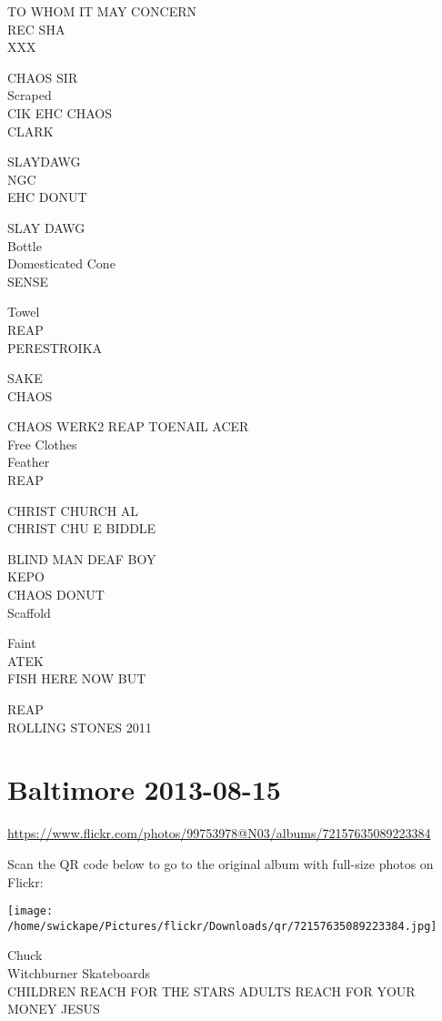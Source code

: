 \documentclass[10pt,letterpaper]{article}
\begin{document}
TO WHOM IT MAY CONCERN\\
REC SHA\\
XXX

CHAOS SIR\\
Scraped\\
CIK EHC CHAOS\\
CLARK

SLAYDAWG\\
NGC\\
EHC DONUT

SLAY DAWG\\
Bottle\\
Domesticated Cone\\
SENSE

Towel\\
REAP\\
PERESTROIKA

SAKE\\
CHAOS

CHAOS WERK2 REAP TOENAIL ACER\\
Free Clothes\\
Feather\\
REAP

CHRIST CHURCH AL\\
CHRIST CHU E BIDDLE

BLIND MAN DEAF BOY\\
KEPO\\
CHAOS DONUT\\
Scaffold

Faint\\
ATEK\\
FISH HERE NOW BUT

REAP\\
ROLLING STONES 2011
\pagebreak

\section*{Baltimore 2013-08-15}

\url{https://www.flickr.com/photos/99753978@N03/albums/72157635089223384}

Scan the QR code below to go to the original album with full-size photos on Flickr:

\texttt{[image: /home/swickape/Pictures/flickr/Downloads/qr/72157635089223384.jpg]}
\pagebreak

Chuck\\
Witchburner Skateboards\\
CHILDREN REACH FOR THE STARS ADULTS REACH FOR YOUR MONEY JESUS
\end{document}
